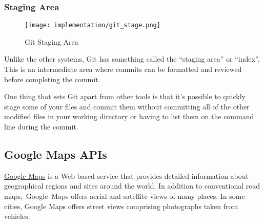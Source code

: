 	\subsubsection{Staging Area}
			\begin{wrapfigure}{r}{0.25\textwidth}
				\texttt{[image: implementation/git\_stage.png]}
				\caption{Git Staging Area}
			\end{wrapfigure}
		Unlike the other systems, Git has something called the ``staging area'' or ``index''. This is an intermediate area where commits can be formatted and reviewed before completing the commit.
		
		One thing that sets Git apart from other tools is that it's possible to quickly stage some of your files and commit them without committing all of the other modified files in your working directory or having to list them on the command line during the commit.
		
\subsection{Google Maps APIs}
	\href{https://developers.google.com/maps/}{Google Maps} is a Web-based service that provides detailed information about geographical regions and sites around the world. In addition to conventional road maps, Google Maps offers aerial and satellite views of many places. In some cities, Google Maps offers street views comprising photographs taken from vehicles.\cite{google_maps}